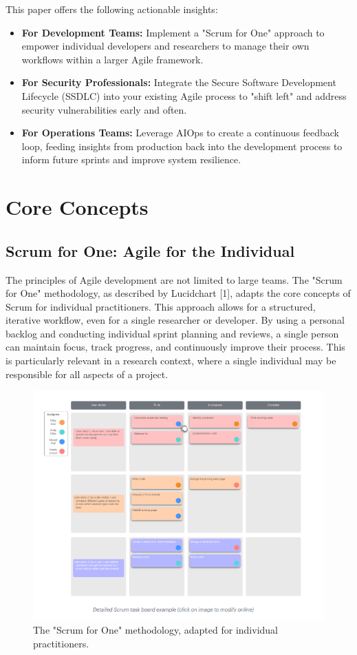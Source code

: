 \documentclass[journal]{IEEEtran}
\begin{document}
This paper offers the following actionable insights:
\begin{itemize}
    \item \textbf{For Development Teams:} Implement a "Scrum for One" approach to empower individual developers and researchers to manage their own workflows within a larger Agile framework.
    \item \textbf{For Security Professionals:} Integrate the Secure Software Development Lifecycle (SSDLC) into your existing Agile process to "shift left" and address security vulnerabilities early and often.
    \item \textbf{For Operations Teams:} Leverage AIOps to create a continuous feedback loop, feeding insights from production back into the development process to inform future sprints and improve system resilience.
\end{itemize}

\section{Core Concepts}

\subsection{Scrum for One: Agile for the Individual}
The principles of Agile development are not limited to large teams. The "Scrum for One" methodology, as described by Lucidchart [1], adapts the core concepts of Scrum for individual practitioners. This approach allows for a structured, iterative workflow, even for a single researcher or developer. By using a personal backlog and conducting individual sprint planning and reviews, a single person can maintain focus, track progress, and continuously improve their process. This is particularly relevant in a research context, where a single individual may be responsible for all aspects of a project.

\begin{figure}[h]
    \centering
    \includegraphics[width=0.8\columnwidth]{image 2.png}
    \caption{The "Scrum for One" methodology, adapted for individual practitioners.}
    \label{fig:scrum_for_one}
\end{figure}
\end{document}
